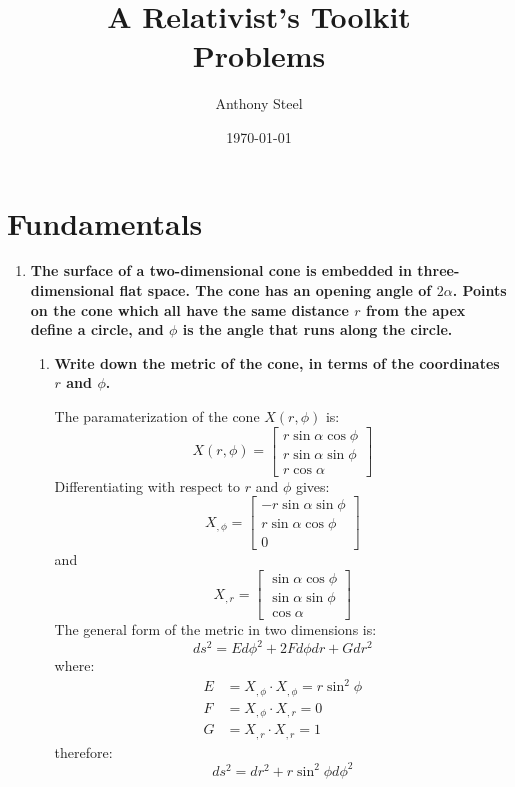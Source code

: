 \documentclass[9pt]{report}
\begin{document}
\title{A Relativist's Toolkit\protect\\ Problems}
\author{Anthony Steel}
\date{\today}
\maketitle
\chapter{Fundamentals}
\begin{enumerate}
  \item \textbf{The surface of a two-dimensional cone is embedded in
      three-dimensional flat space. The cone has an opening angle of
      $2\alpha$. Points on the cone which all have the same distance
      $r$ from the apex define a circle, and $\phi$ is the angle that
      runs along the circle.
    }
    \begin{enumerate}
      \item \textbf{Write down the metric of the cone, in terms of the
        coordinates $r$ and $\phi$.}

        The paramaterization of the cone $X(r, \phi)$ is:
        \[
          X(r, \phi) =
          \begin{bmatrix}
            r \sin\alpha \cos \phi\\
            r \sin\alpha \sin \phi \\
            r \cos \alpha
          \end{bmatrix}
        \]
        Differentiating with respect to $r$ and $\phi$ gives:
        \[
          X_{,\phi} =
          \begin{bmatrix}
            - r \sin\alpha \sin\phi \\
              r \sin\alpha \cos\phi \\
              0
          \end{bmatrix}
        \]
        and
        \[
          X_{,r} =
          \begin{bmatrix}
            \sin\alpha \cos \phi \\
            \sin \alpha \sin \phi \\
            \cos\alpha
          \end{bmatrix}
        \]
        The general form of the metric in two dimensions is:
        \[
          ds^2 = E d\phi^2 + 2F d\phi dr + G dr^2
        \]
        where:
        \[
          \begin{align}
            E &= X_{,\phi} \cdot X_{,\phi} = r\sin^2\phi \\
            F &= X_{,\phi} \cdot X_{,r} = 0\\
            G &= X_{,r} \cdot X_{,r} = 1
          \end{align}
        \]
        therefore:
        \[
          ds^2 = dr^2 + r\sin^2\phi d\phi^2
        \]


\end{enumerate}
\end{enumerate}
\end{document}
